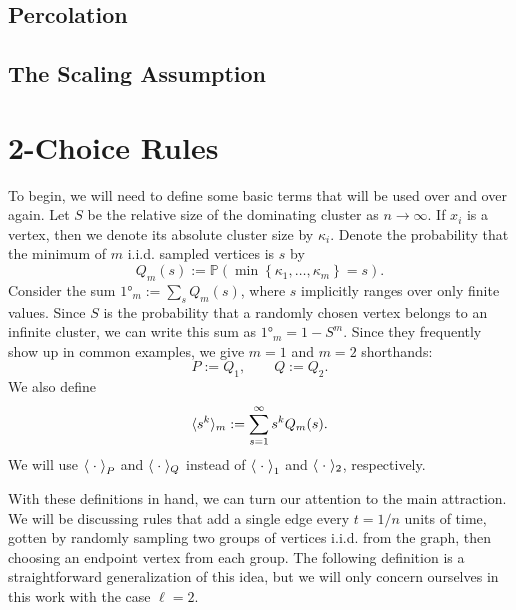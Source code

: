 \documentclass[twoside,10pt]{article}
\begin{document}
\subsection{Percolation}



\subsection{The Scaling Assumption}




\section{2-Choice Rules}

To begin, we will need to define some basic terms that will be used over and over again. Let $S$ be the relative size of the dominating cluster as $n \to \infty$. If $x_i$ is a vertex, then we denote its absolute cluster size by $\kappa_i$. Denote the probability that the minimum of $m$ i.i.d. sampled vertices is $s$ by
\[
        Q_m(s) := \mathbb{P}\left( \min\left\{ \kappa_1, \dots, \kappa_m \right\} = s \right) .
\]
Consider the sum $\ang{1}_{m} := \sum_{s} Q_{m}(s)$, where $s$ implicitly ranges over only finite values. Since $S$ is the probability that a randomly chosen vertex belongs to an infinite cluster, we can write this sum as $\ang{1}_{m} = 1-S^{m}$. Since they frequently show up in common examples, we give $m=1$ and $m=2$ shorthands:
\[
        P := Q_1, \quad\quad Q := Q_2.
\]
We also define
\[
        \langle s^{k} \rangle_{m} := \sum_{s=1}^{\infty} s^{k} Q_m(s).
\]
We will use $\left\langle \;\cdot\; \right\rangle_{P}$ and $\langle \;\cdot\; \rangle_{Q}$ instead of $\left\langle \;\cdot\; \right\rangle_{1}$ and $\langle \;\cdot\; \rangle_{2}$, respectively.

With these definitions in hand, we can turn our attention to the main attraction. We will be discussing rules that add a single edge every $t=1/n$ units of time, gotten by randomly sampling two groups of vertices i.i.d. from the graph, then choosing an endpoint vertex from each group. The following definition is a straightforward generalization of this idea, but we will only concern ourselves in this work with the case $\ell=2$.
\end{document}
